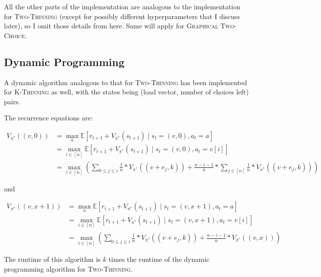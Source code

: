 All the other parts of the implementation are analogous to the implementation for \textsc{Two-Thinning} (except for possibly different hyperparameters that I discuss later), so I omit those details from here. Same will apply for \textsc{Graphical Two-Choice}.



\subsection{Dynamic Programming}


A dynamic algorithm analogous to that for \textsc{Two-Thinning} has been implemented for \textsc{K-Thinning} as well, with the states being (load vector, number of choices left) pairs.


The recurrence equations are: 

\begin{equation} \label{eq:kthinning-dynamicprogramming-0left}
\begin{split}
    V_{\pi^*}((v, 0)) &= \max_a \mathbb{E} [r_{t+1} + V_{\pi^*}(s_{t+1}) \mid s_t=(v,0), a_t=a] \\
    &= \max_{i \in [n]} \mathbb{E} [r_{t+1} + V_{\pi^*}(s_{t+1}) \mid s_t=(v,0), a_t=v[i]] \\
    &= \max_{i \in [n]} (\sum_{0\leq j \leq i} \frac{1}{n}*V_{\pi^*}((v+e_j,k)) + \frac{n-i-1}{n} * \sum_{j \in [n]} \frac{1}{n}*V_{\pi^*}((v+e_j,k)))
\end{split}
\end{equation}

and 

\begin{equation} \label{eq:kthinning-dynamicprogramming-xleft}
\begin{split}
    V_{\pi^*}((v, x+1)) &= \max_a \mathbb{E} [r_{t+1} + V_{\pi^*}(s_{t+1}) \mid s_t=(v,x+1), a_t=a] \\
    &= \max_{i \in [n]} \mathbb{E} [r_{t+1} + V_{\pi^*}(s_{t+1}) \mid s_t=(v, x+1), a_t=v[i]] \\
    &= \max_{i \in [n]} (\sum_{0\leq j \leq i} \frac{1}{n}*V_{\pi^*}((v+e_j,k)) + \frac{n-i-1}{n} * V_{\pi^*}((v, x)))
\end{split}
\end{equation}

The runtime of this algorithm is $k$ times the runtime of the dynamic programming algorithm for \textsc{Two-Thinning}.


